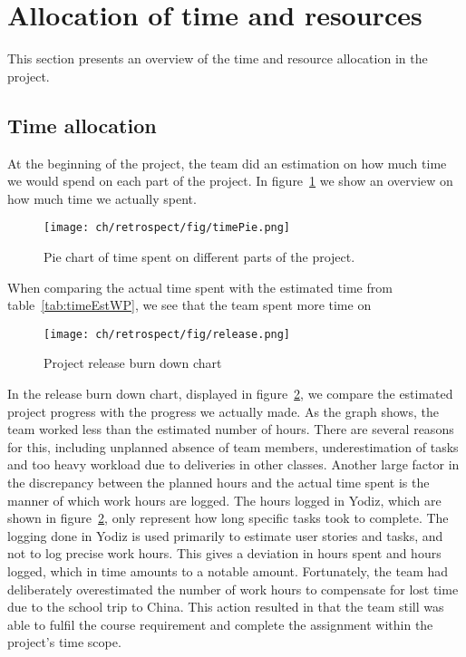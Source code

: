 \section{Allocation of time and resources}
This section presents an overview of the time and resource allocation in the project.

\subsection{Time allocation}
At the beginning of the project, the team did an estimation on how much time we would spend on each part of the project. In figure~\ref{fig:piechart} we show an overview on how much time we actually spent.

\begin{figure}[H]
\centering
\texttt{[image: ch/retrospect/fig/timePie.png]}
\caption{Pie chart of time spent on different parts of the project.}
\label{fig:piechart}
\end{figure}

When comparing the actual time spent with the estimated time from table~\ref{tab:timeEstWP}, we see that the team spent more time on 

\begin{figure}[H]
\centering
\texttt{[image: ch/retrospect/fig/release.png]}
\caption{Project release burn down chart}
\label{fig:release}
\end{figure}

\noindent In the release burn down chart, displayed in figure~\ref{fig:release}, we compare the estimated project progress with the progress we actually made. As the graph shows, the team worked less than the estimated number of hours. There are several reasons for this, including unplanned absence of team members, underestimation of tasks and too heavy workload due to deliveries in other classes. Another large factor in the discrepancy between the planned hours and the actual time spent is the manner of which work hours are logged. The hours logged in Yodiz, which are shown in figure~\ref{fig:release}, only represent how long specific tasks took to complete. The logging done in Yodiz is used primarily to estimate user stories and tasks, and not to log precise work hours. This gives a deviation in hours spent and hours logged, which in time amounts to a notable amount. Fortunately, the team had deliberately overestimated the number of work hours to compensate for lost time due to the school trip to China. This action resulted in that the team still was able to fulfil the course requirement and complete the assignment within the project's time scope.

